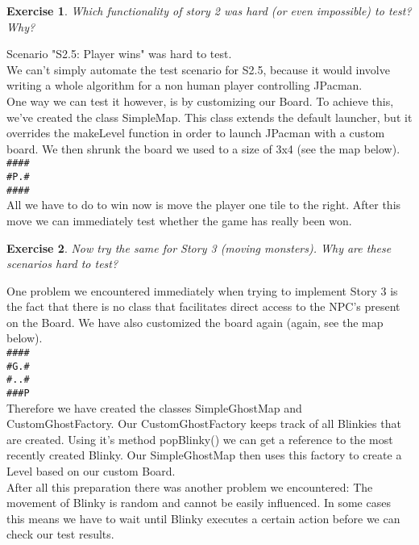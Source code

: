 \documentclass[a4paper]{article}
\newtheorem{thm}{Exercise}
\begin{document}
	\newpage
    \begin{thm}
      Which functionality of story 2 was hard (or even impossible) to test? Why?
    \end{thm}
    Scenario "S2.5: Player wins" was hard to test. \\
    We can't simply automate the test scenario for S2.5, because it would involve writing a whole algorithm for a non human player controlling JPacman. \\
    One way we can test it however, is by customizing our Board. To achieve this, we've created the class SimpleMap.
    This class extends the default launcher, but it overrides the makeLevel function in order to launch JPacman with a custom board. 
    We then shrunk the board we used to a size of 3x4 (see the map below). \\
    \verb|####| \\
    \verb|#P.#| \\
    \verb|####| \\
    All we have to do to win now is move the player one tile to the right. After this move we can immediately test whether the game has really been won.


    \begin{thm}
      Now try the same for Story 3 (moving monsters). Why are these scenarios hard to test?
    \end{thm}
    One problem we encountered immediately when trying to implement Story 3 is the fact that there is no class that facilitates direct access to the NPC's present on the Board.
    We have also customized the board again (again, see the map below). \\
    \verb|####| \\
	\verb|#G.#| \\
	\verb|#..#| \\
	\verb|###P| \\
    Therefore we have created the classes SimpleGhostMap and CustomGhostFactory.
	Our CustomGhostFactory keeps track of all Blinkies that are created. Using it's method popBlinky() we can get a reference to the most recently created Blinky.
	Our SimpleGhostMap then uses this factory to create a Level based on our custom Board. \\
	After all this preparation there was another problem we encountered: The movement of Blinky is random and cannot be easily influenced.
	In some cases this means we have to wait until Blinky executes a certain action before we can check our test results.
    
\end{document}
